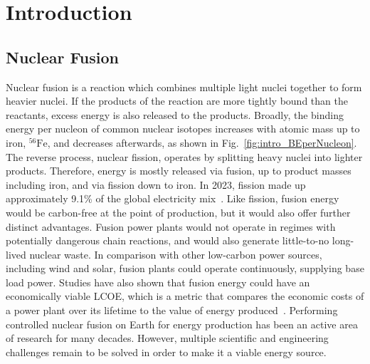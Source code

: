 \chapter{Introduction}%
\label{chap:intro}


\section{Nuclear Fusion}%
\label{sec:intro_whatisfusion}

Nuclear fusion is a reaction which combines multiple light nuclei together to form heavier nuclei.
If the products of the reaction are more tightly bound than the reactants, excess energy is also released to the products.
Broadly, the binding energy per nucleon of common nuclear isotopes increases with atomic mass up to iron, ${}^{56}\text{Fe}$, and decreases afterwards, as shown in Fig.~\ref{fig:intro_BEperNucleon}.
The reverse process, nuclear fission, operates by splitting heavy nuclei into lighter products.
Therefore, energy is mostly released via fusion, up to product masses including iron, and via fission down to iron.
In 2023, fission made up approximately 9.1\% of the global electricity mix~\cite{emberinstitute_statistical_2024}.
Like fission, fusion energy would be carbon-free at the point of production, but it would also offer further distinct advantages.
Fusion power plants would not operate in regimes with potentially dangerous chain reactions, and would also generate little-to-no long-lived nuclear waste.
In comparison with other low-carbon power sources, including wind and solar, fusion plants could operate continuously, supplying base load power.
Studies have also shown that fusion energy could have an economically viable \ac{LCOE}, which is a metric that compares the economic costs of a power plant over its lifetime to the value of energy produced~\cite{griffiths_commercialisation_2022}.
Performing controlled nuclear fusion on Earth for energy production has been an active area of research for many decades.
However, multiple scientific and engineering challenges remain to be solved in order to make it a viable energy source.

